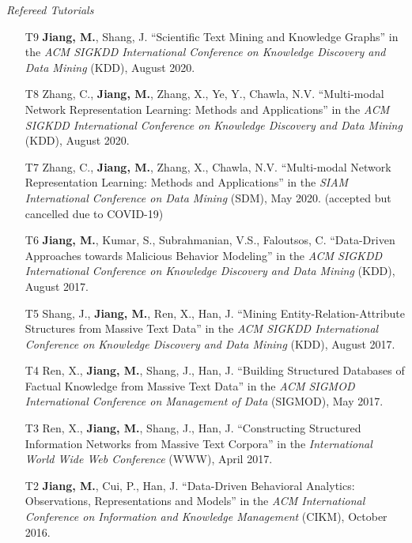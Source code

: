 \documentclass[10pt]{article}
\newenvironment{myindentpar}[1]%
{\begin{list}{}%
         {\setlength{\leftmargin}{#1}}%
         \item[]%
}
{\end{list}}
\newcounter{list}
\begin{document}
\begin{myindentpar}{0.00cm}
\hspace{-0.25cm}\textit{Refereed Tutorials}

\begin{enumerate}[leftmargin=.5cm]

\item[T9] \textbf{Jiang, M.}, Shang, J. ``Scientific Text Mining and Knowledge Graphs'' in the \textit{ACM SIGKDD International Conference on Knowledge Discovery and Data Mining} (KDD), August 2020.
		
\item[T8] Zhang, C., \textbf{Jiang, M.}, Zhang, X., Ye, Y., Chawla, N.V. ``Multi-modal Network Representation Learning: Methods and Applications'' in the \textit{ACM SIGKDD International Conference on Knowledge Discovery and Data Mining} (KDD), August 2020.

\item[T7] Zhang, C., \textbf{Jiang, M.}, Zhang, X., Chawla, N.V. ``Multi-modal Network Representation Learning: Methods and Applications'' in the \textit{SIAM International Conference on Data Mining} (SDM), May 2020. (accepted but cancelled due to COVID-19)

\item[T6] \textbf{Jiang, M.}, Kumar, S., Subrahmanian, V.S., Faloutsos, C. ``Data-Driven Approaches towards Malicious Behavior Modeling'' in the \textit{ACM SIGKDD International Conference on Knowledge Discovery and Data Mining} (KDD), August 2017.

\item[T5] Shang, J., \textbf{Jiang, M.}, Ren, X., Han, J. ``Mining Entity-Relation-Attribute Structures from Massive Text Data'' in the \textit{ACM SIGKDD International Conference on Knowledge Discovery and Data Mining} (KDD), August 2017.

\item[T4] Ren, X., \textbf{Jiang, M.}, Shang, J., Han, J. ``Building Structured Databases of Factual Knowledge from Massive Text Data'' in the \textit{ACM SIGMOD International Conference on Management of Data} (SIGMOD), May 2017.
		
\item[T3] Ren, X., \textbf{Jiang, M.}, Shang, J., Han, J. ``Constructing Structured Information Networks from Massive Text Corpora'' in the \textit{International World Wide Web Conference}  (WWW), April 2017.

\item[T2] \textbf{Jiang, M.}, Cui, P., Han, J. ``Data-Driven Behavioral Analytics: Observations, Representations and Models'' in the \textit{ACM International Conference on Information and Knowledge Management} (CIKM), October 2016.
		

\end{enumerate}
\end{myindentpar}
\end{document}
